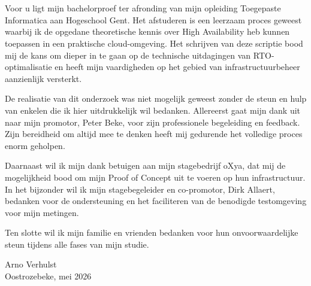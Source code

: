 
\chapter*{}%
\label{ch:voorwoord}


Voor u ligt mijn bachelorproef ter afronding van mijn opleiding Toegepaste Informatica aan Hogeschool Gent. Het afstuderen is een leerzaam proces geweest waarbij ik de opgedane theoretische kennis over High Availability heb kunnen toepassen in een praktische cloud-omgeving. Het schrijven van deze scriptie bood mij de kans om dieper in te gaan op de technische uitdagingen van RTO-optimalisatie en heeft mijn vaardigheden op het gebied van infrastructuurbeheer aanzienlijk versterkt.
\medskip

De realisatie van dit onderzoek was niet mogelijk geweest zonder de steun en hulp van enkelen die ik hier uitdrukkelijk wil bedanken. Allereerst gaat mijn dank uit naar mijn promotor, Peter Beke, voor zijn professionele begeleiding en feedback. Zijn bereidheid om altijd mee te denken heeft mij gedurende het volledige proces enorm geholpen.
\medskip

Daarnaast wil ik mijn dank betuigen aan mijn stagebedrijf oXya, dat mij de mogelijkheid bood om mijn Proof of Concept uit te voeren op hun infrastructuur. In het bijzonder wil ik mijn stagebegeleider en co-promotor, Dirk Allaert, bedanken voor de ondersteuning en het faciliteren van de benodigde testomgeving voor mijn metingen.
\medskip

Ten slotte wil ik mijn familie en vrienden bedanken voor hun onvoorwaardelijke steun tijdens alle fases van mijn studie.
\medskip

\noindent Arno Verhulst \\
Oostrozebeke, mei 2026